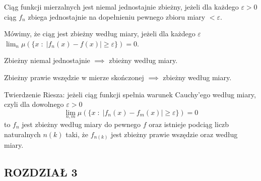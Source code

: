 \documentclass{article}[13pt]
\begin{document}
\begin{multicols}{2}
    Ciąg funkcji mierzalnych jest {\color{def}niemal jednostajnie zbieżny}, jeżeli dla każdego $\varepsilon>0$ ciąg $f_n$ zbiega jednostajnie na dopełnieniu pewnego zbioru miary $<\varepsilon$.
    \medskip

    Mówimy, że ciąg jest {\color{def}zbieżny według miary}, jeżeli dla każdego $\varepsilon$ $\lim_n\mu(\{x\;:\;|f_n(x)-f(x)|\geq\varepsilon\})=0$.
    \medskip

    {\color{acc}\point} Zbieżny niemal jednostajnie $\implies$ zbieżny według miary.

    {\color{acc}\point} Zbieżny prawie wszędzie w mierze skończonej $\implies$ zbieżny według miary.
    \medskip

    {\color{def}Twierdzenie Riesza}: jeżeli ciąg funkcji spełnia {\color{acc}warunek Cauchy'ego według miary}, czyli dla dowolnego $\varepsilon>0$
    $$\lim_{n,m}\mu(\{x\;:\;|f_n(x)-f_m(x)|\geq\varepsilon\})=0$$
    to $f_n$ jest zbieżny według miary do pewnego $f$ oraz istnieje podciąg liczb naturalnych $n(k)$ taki, że $f_{n(k)}$ jest zbieżny prawie wszędzie oraz według miary.
\end{multicols}
\bigskip

\bigskip

\subsection*{ROZDZIAŁ 3}
\end{document}
